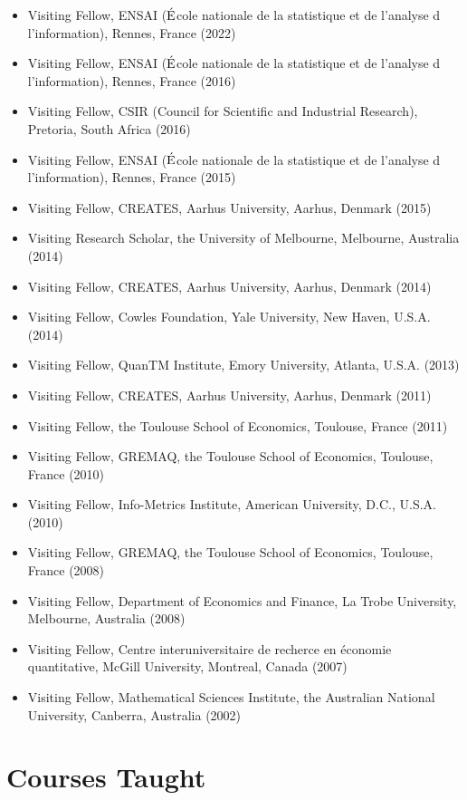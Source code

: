 \documentclass[
]{article}
\begin{document}
\begin{itemize}
\item
  Visiting Fellow, ENSAI (\(\acute{\text E}\)cole nationale de la
  statistique et de l'analyse d l'information), Rennes, France (2022)
\item
  Visiting Fellow, ENSAI (\(\acute{\text E}\)cole nationale de la
  statistique et de l'analyse d l'information), Rennes, France (2016)
\item
  Visiting Fellow, CSIR (Council for Scientific and Industrial
  Research), Pretoria, South Africa (2016)
\item
  Visiting Fellow, ENSAI (\(\acute{\text E}\)cole nationale de la
  statistique et de l'analyse d l'information), Rennes, France (2015)
\item
  Visiting Fellow, CREATES, Aarhus University, Aarhus, Denmark (2015)
\item
  Visiting Research Scholar, the University of Melbourne, Melbourne,
  Australia (2014)
\item
  Visiting Fellow, CREATES, Aarhus University, Aarhus, Denmark (2014)
\item
  Visiting Fellow, Cowles Foundation, Yale University, New Haven, U.S.A.
  (2014)
\item
  Visiting Fellow, QuanTM Institute, Emory University, Atlanta, U.S.A.
  (2013)
\item
  Visiting Fellow, CREATES, Aarhus University, Aarhus, Denmark (2011)
\item
  Visiting Fellow, the Toulouse School of Economics, Toulouse, France
  (2011)
\item
  Visiting Fellow, GREMAQ, the Toulouse School of Economics, Toulouse,
  France (2010)
\item
  Visiting Fellow, Info-Metrics Institute, American University, D.C.,
  U.S.A. (2010)
\item
  Visiting Fellow, GREMAQ, the Toulouse School of Economics, Toulouse,
  France (2008)
\item
  Visiting Fellow, Department of Economics and Finance, La Trobe
  University, Melbourne, Australia (2008)
\item
  Visiting Fellow, Centre interuniversitaire de recherce en économie
  quantitative, McGill University, Montreal, Canada (2007)
\item
  Visiting Fellow, Mathematical Sciences Institute, the Australian
  National University, Canberra, Australia (2002)
\end{itemize}

\section*{Courses Taught}\label{courses-taught}
\end{document}
